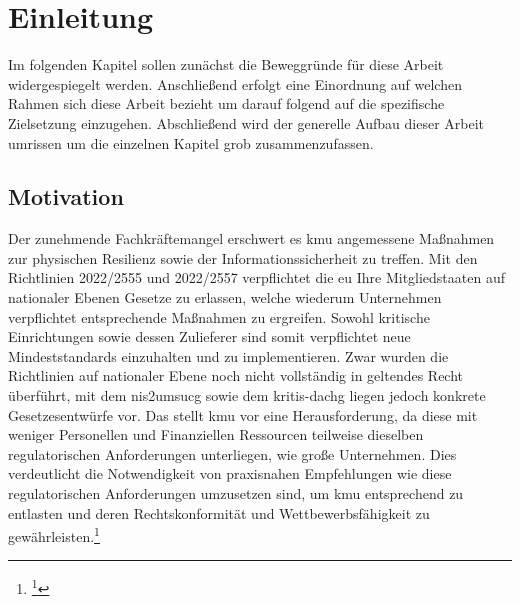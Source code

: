 \documentclass[11pt,a4paper,hidelinks]{article}   %
\begin{document}
    \clearpage

    \newpage
    \tableofcontents
	\newpage
	\listoftables
	\newpage
    \printglossary[type=\acronymtype, title=Abkürzungsverzeichnis, toctitle=Abkürzungsverzeichnis]

    \newpage
    \section{Einleitung}
    Im folgenden Kapitel sollen zunächst die Beweggründe für diese Arbeit widergespiegelt werden. Anschließend erfolgt eine Einordnung auf welchen Rahmen sich diese Arbeit bezieht um darauf folgend auf die spezifische Zielsetzung einzugehen. Abschließend wird der generelle Aufbau dieser Arbeit umrissen um die einzelnen Kapitel grob zusammenzufassen.
    \subsection{Motivation}\label{sec:Einleitung_Motivation}
        Der zunehmende Fachkräftemangel erschwert es \gls{kmu} angemessene Maßnahmen zur physischen Resilienz sowie der Informationssicherheit zu treffen. Mit den Richtlinien 2022/2555 und 2022/2557 verpflichtet die \gls{eu} Ihre Mitgliedstaaten auf nationaler Ebenen Gesetze zu erlassen, welche wiederum Unternehmen verpflichtet entsprechende Maßnahmen zu ergreifen. Sowohl kritische Einrichtungen sowie dessen Zulieferer sind somit verpflichtet neue Mindeststandards einzuhalten und zu implementieren. Zwar wurden die Richtlinien auf nationaler Ebene noch nicht vollständig in geltendes Recht überführt, mit dem \gls{nis2umsucg} sowie dem \gls{kritis-dachg} liegen jedoch konkrete Gesetzesentwürfe vor. Das stellt \gls{kmu} vor eine Herausforderung, da diese mit weniger Personellen und Finanziellen Ressourcen teilweise dieselben regulatorischen Anforderungen unterliegen, wie große Unternehmen. Dies verdeutlicht die Notwendigkeit von praxisnahen Empfehlungen wie diese regulatorischen Anforderungen umzusetzen sind, um \gls{kmu} entsprechend zu entlasten und deren Rechtskonformität und Wettbewerbsfähigkeit zu gewährleisten.\footnote{
            \footcite[][]{MISSING}
        }
\end{document}
